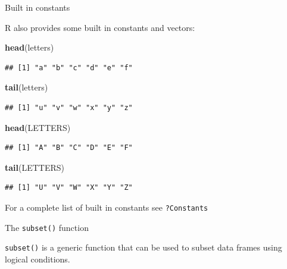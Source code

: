 \documentclass[ignorenonframetext,]{beamer}
\newenvironment{Shaded}{\begin{snugshade}}{\end{snugshade}}
\newcommand{\KeywordTok}[1]{\textcolor[rgb]{0.13,0.29,0.53}{\textbf{#1}}}
\newcommand{\NormalTok}[1]{#1}
\begin{document}
\begin{frame}[fragile]{Built in constants}
\protect\hypertarget{built-in-constants}{}

R also provides some built in constants and vectors:

\begin{Shaded}
\begin{Highlighting}[]
\KeywordTok{head}\NormalTok{(letters)}
\end{Highlighting}
\end{Shaded}

\begin{verbatim}
## [1] "a" "b" "c" "d" "e" "f"
\end{verbatim}

\begin{Shaded}
\begin{Highlighting}[]
\KeywordTok{tail}\NormalTok{(letters)}
\end{Highlighting}
\end{Shaded}

\begin{verbatim}
## [1] "u" "v" "w" "x" "y" "z"
\end{verbatim}

\begin{Shaded}
\begin{Highlighting}[]
\KeywordTok{head}\NormalTok{(LETTERS)}
\end{Highlighting}
\end{Shaded}

\begin{verbatim}
## [1] "A" "B" "C" "D" "E" "F"
\end{verbatim}

\begin{Shaded}
\begin{Highlighting}[]
\KeywordTok{tail}\NormalTok{(LETTERS)}
\end{Highlighting}
\end{Shaded}

\begin{verbatim}
## [1] "U" "V" "W" "X" "Y" "Z"
\end{verbatim}

For a complete list of built in constants see \texttt{?Constants}

\end{frame}

\begin{frame}[fragile]{The \texttt{subset()} function}
\protect\hypertarget{the-subset-function}{}

\texttt{subset()} is a generic function that can be used to subset data
frames using logical conditions.

\end{frame}
\end{document}
